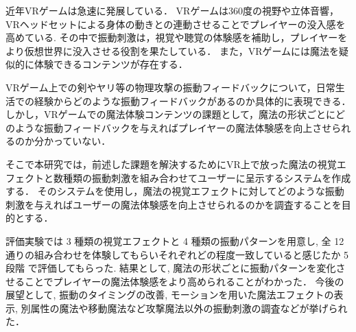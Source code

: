 近年VRゲームは急速に発展している．
VRゲームは360度の視野や立体音響，VRヘッドセットによる身体の動きとの連動させることでプレイヤーの没入感を高めている.
その中で振動刺激は，視覚や聴覚の体験感を補助し，プレイヤーをより仮想世界に没入させる役割を果たしている．
また，VRゲームには魔法を疑似的に体験できるコンテンツが存在する．

VRゲーム上での剣やヤリ等の物理攻撃の振動フィードバックについて，日常生活での経験からどのような振動フィードバックがあるのか具体的に表現できる．
しかし，VRゲームでの魔法体験コンテンツの課題として，魔法の形状ごとにどのような振動フィードバックを与えればプレイヤーの魔法体験感を向上させられるのか分かっていない．

そこで本研究では，前述した課題を解決するためにVR上で放った魔法の視覚エフェクトと数種類の振動刺激を組み合わせてユーザーに呈示するシステムを作成する．
そのシステムを使用し，魔法の視覚エフェクトに対してどのような振動刺激を与えればユーザーの魔法体験感を向上させられるのかを調査することを目的とする．

評価実験では 3 種類の視覚エフェクトと 4 種類の振動パターンを用意し, 全 12 通りの組み合わせを体験してもらいそれぞれどの程度一致していると感じたか 5 段階
で評価してもらった. 
結果として, 魔法の形状ごとに振動パターンを変化させることでプレイヤーの魔法体験感をより高められることがわかった．
今後の展望として, 振動のタイミングの改善, モーションを用いた魔法エフェクトの表示, 別属性の魔法や移動魔法など攻撃魔法以外の振動刺激の調査などが挙げられた．
